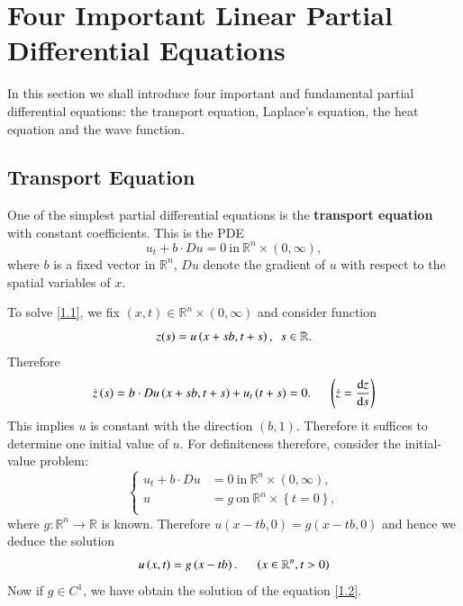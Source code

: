 \section{Four Important Linear Partial Differential Equations}
In this section we shall introduce four important and fundamental partial differential equations: the transport equation, Laplace's equation, the heat equation and the wave function.
\subsection{Transport Equation}
One of the simplest partial differential equations is the \textbf{transport equation} with constant coefficients. This is the PDE 
\begin{equation}\label{1.1}
u_t+b\cdot Du=0\ \text{in}\ \mathbb{R} ^n\times \left( 0,\infty \right) ,
\end{equation}
where $b$ is a fixed vector in $\mathbb{R}^n$, $Du$ denote the gradient of $u$ with respect to the spatial variables of $x$.\par
To solve \eqref{1.1}, we fix $(x,t)\in\mathbb{R}^n\times(0,\infty)$ and consider function 
$$
z(s)=u\left( x+sb,t+s \right) ,\hspace{0.5em}s\in \mathbb{R} .
$$
Therefore 
$$
\dot{z}\left( s \right) =b\cdot Du\left( x+sb,t+s \right) +u_t\left( t+s \right) =0.\hspace{0.5cm}\left( \dot{z}=\frac{\mathrm{d}z}{\mathrm{d}s} \right) 
$$
This implies $u$ is constant with the direction $(b,1)$. Therefore it suffices to determine one initial value of $u$. For definiteness therefore, consider the initial-value problem: 
\begin{equation}\label{1.2}
\left\{ \begin{aligned}
	u_t+b\cdot Du&=0\ \text{in}\ \mathbb{R} ^n\times \left( 0,\infty \right) ,\\
	u&=g\ \text{on}\ \mathbb{R} ^n\times \left\{ t=0 \right\} ,\\
\end{aligned} \right. 
\end{equation}
where $g:\mathbb{R}^n\to\mathbb{R}$ is known. Therefore $u(x-tb,0)=g(x-tb,0)$ and hence we deduce the solution 
\begin{equation}\label{1.3}
u\left( x,t \right) =g\left( x-tb \right) .\hspace{0.5cm}\left( x\in \mathbb{R} ^n,t>0 \right) 
\end{equation}
Now if $g\in C^1$, we have obtain the solution of the equation \eqref{1.2}.\par
